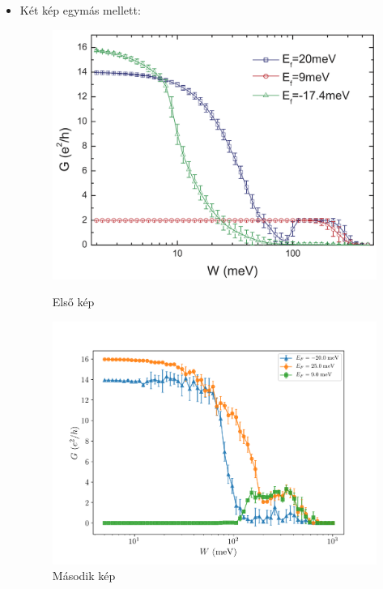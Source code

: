 \documentclass[12pt]{article}
\theoremstyle{plain}
\begin{document}
\begin{itemize}
    \item Két kép egymás mellett:
    \begin{figure}[H]
        \centering
        \begin{minipage}{0.47\textwidth}
          \centering
          \includegraphics[width=1.0\textwidth]{./media/tai_results_from_article.png}
          \caption{Első kép}
      \end{minipage}\hfill
        \begin{minipage}{0.53\textwidth}
            \centering
            \includegraphics[width=1.0\textwidth]{./media/tai_results_params1_nsamples=4.png}
            \caption{Második kép}
        \end{minipage}
      \end{figure}


\end{itemize}
\end{document}
